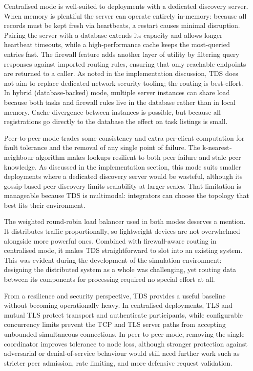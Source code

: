 \documentclass[10pt,a4paper]{article}
\begin{document}
Centralised mode is well-suited to deployments with a dedicated discovery server. When memory is plentiful the server can operate entirely in-memory: because all records must be kept fresh via heartbeats, a restart causes minimal disruption. Pairing the server with a database extends its capacity and allows longer heartbeat timeouts, while a high-performance cache keeps the most-queried entries fast. The firewall feature adds another layer of utility by filtering query responses against imported routing rules, ensuring that only reachable endpoints are returned to a caller. As noted in the implementation discussion, TDS does not aim to replace dedicated network security tooling; the routing is best-effort. In hybrid (database-backed) mode, multiple server instances can share load because both tasks and firewall rules live in the database rather than in local memory. Cache divergence between instances is possible, but because all registrations go directly to the database the effect on task listings is small.

Peer-to-peer mode trades some consistency and extra per-client computation for fault tolerance and the removal of any single point of failure. The k-nearest-neighbour algorithm makes lookups resilient to both peer failure and stale peer knowledge. As discussed in the implementation section, this mode suits smaller deployments where a dedicated discovery server would be wasteful, although its gossip-based peer discovery limits scalability at larger scales. That limitation is manageable because TDS is multimodal: integrators can choose the topology that best fits their environment.

The weighted round-robin load balancer used in both modes deserves a mention. It distributes traffic proportionally, so lightweight devices are not overwhelmed alongside more powerful ones. Combined with firewall-aware routing in centralised mode, it makes TDS straightforward to slot into an existing system. This was evident during the development of the simulation environment: designing the distributed system as a whole was challenging, yet routing data between its components for processing required no special effort at all.

From a resilience and security perspective, TDS provides a useful baseline without becoming operationally heavy. In centralised deployments, TLS and mutual TLS protect transport and authenticate participants, while configurable concurrency limits prevent the TCP and TLS server paths from accepting unbounded simultaneous connections. In peer-to-peer mode, removing the single coordinator improves tolerance to node loss, although stronger protection against adversarial or denial-of-service behaviour would still need further work such as stricter peer admission, rate limiting, and more defensive request validation.
\end{document}
